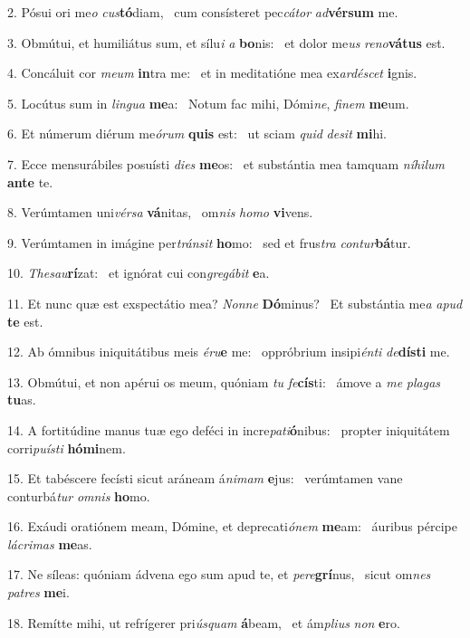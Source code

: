 2. Pósui ori me\textit{o} \textit{cus}\textbf{tó}diam, \ast\  cum consísteret pec\textit{cá}\textit{tor} \textit{ad}\textbf{vér}\textbf{sum} me.\

3. Obmútui, et humiliátus sum, et sílu\textit{i} \textit{a} \textbf{bo}nis: \ast\  et dolor me\textit{us} \textit{re}\textit{no}\textbf{vá}\textbf{tus} est.\

4. Concáluit cor \textit{me}\textit{um} \textbf{in}tra me: \ast\  et in meditatióne mea ex\textit{ar}\textit{dé}\textit{scet} \textbf{i}gnis.\

5. Locútus sum in \textit{lin}\textit{gua} \textbf{me}a: \ast\  Notum fac mihi, Dómi\textit{ne}, \textit{fi}\textit{nem} \textbf{me}um.\

6. Et númerum diérum me\textit{ó}\textit{rum} \textbf{quis} est: \ast\  ut sciam \textit{quid} \textit{de}\textit{sit} \textbf{mi}hi.\

7. Ecce mensurábiles posuísti \textit{di}\textit{es} \textbf{me}os: \ast\  et substántia mea tamquam \textit{ní}\textit{hi}\textit{lum} \textbf{an}\textbf{te} te.\

8. Verúmtamen uni\textit{vér}\textit{sa} \textbf{vá}nitas, \ast\  om\textit{nis} \textit{ho}\textit{mo} \textbf{vi}vens.\

9. Verúmtamen in imágine per\textit{tráns}\textit{it} \textbf{ho}mo: \ast\  sed et frus\textit{tra} \textit{con}\textit{tur}\textbf{bá}tur.\

10. \textit{The}\textit{sau}\textbf{rí}zat: \ast\  et ignórat cui con\textit{gre}\textit{gá}\textit{bit} \textbf{e}a.\

11. Et nunc quæ est exspectátio mea? \textit{Non}\textit{ne} \textbf{Dó}minus? \ast\  Et substántia me\textit{a} \textit{a}\textit{pud} \textbf{te} est.\

12. Ab ómnibus iniquitátibus meis \textit{é}\textit{ru}\textbf{e} me: \ast\  oppróbrium insipi\textit{én}\textit{ti} \textit{de}\textbf{dís}\textbf{ti} me.\

13. Obmútui, et non apérui os meum, quóniam \textit{tu} \textit{fe}\textbf{cís}ti: \ast\  ámove a \textit{me} \textit{pla}\textit{gas} \textbf{tu}as.\

14. A fortitúdine manus tuæ ego deféci in incre\textit{pa}\textit{ti}\textbf{ó}nibus: \ast\  propter iniquitátem corri\textit{pu}\textit{ís}\textit{ti} \textbf{hó}\textbf{mi}nem.\

15. Et tabéscere fecísti sicut aráneam á\textit{ni}\textit{mam} \textbf{e}jus: \ast\  verúmtamen vane conturbá\textit{tur} \textit{om}\textit{nis} \textbf{ho}mo.\

16. Exáudi oratiónem meam, Dómine, et deprecati\textit{ó}\textit{nem} \textbf{me}am: \ast\  áuribus pércipe \textit{lá}\textit{cri}\textit{mas} \textbf{me}as.\

17. Ne síleas: quóniam ádvena ego sum apud te, et \textit{per}\textit{e}\textbf{grí}nus, \ast\  sicut om\textit{nes} \textit{pa}\textit{tres} \textbf{me}i.\

18. Remítte mihi, ut refrígerer pri\textit{ús}\textit{quam} \textbf{á}beam, \ast\  et ám\textit{pli}\textit{us} \textit{non} \textbf{e}ro.\

